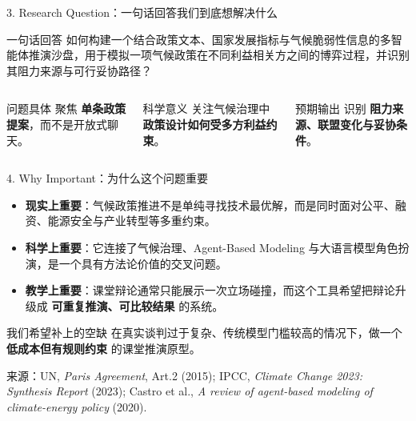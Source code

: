 \documentclass[aspectratio=169,10.5pt]{ctexbeamer}
\newcommand{\source}[1]{\vfill{\tiny\color{textgray}来源：#1}}
\begin{document}
\begin{frame}{3. Research Question：一句话回答我们到底想解决什么}
  \begin{alertblock}{一句话回答}
    如何构建一个结合政策文本、国家发展指标与气候脆弱性信息的多智能体推演沙盘，用于模拟一项气候政策在不同利益相关方之间的博弈过程，并识别其阻力来源与可行妥协路径？
  \end{alertblock}
  \begin{columns}[T]
    \begin{block}{问题具体}
      聚焦 \textbf{单条政策提案}，而不是开放式聊天。
    \end{block}
    \begin{block}{科学意义}
      关注气候治理中 \textbf{政策设计如何受多方利益约束}。
    \end{block}
    \begin{block}{预期输出}
      识别 \textbf{阻力来源、联盟变化与妥协条件}。
    \end{block}
  \end{columns}
\end{frame}

\begin{frame}{4. Why Important：为什么这个问题重要}
  \begin{itemize}
    \item \textbf{现实上重要}：气候政策推进不是单纯寻找技术最优解，而是同时面对公平、融资、能源安全与产业转型等多重约束。
    \item \textbf{科学上重要}：它连接了气候治理、Agent-Based Modeling 与大语言模型角色扮演，是一个具有方法论价值的交叉问题。
    \item \textbf{教学上重要}：课堂辩论通常只能展示一次立场碰撞，而这个工具希望把辩论升级成 \textbf{可重复推演、可比较结果} 的系统。
  \end{itemize}
  \begin{alertblock}{我们希望补上的空缺}
    在真实谈判过于复杂、传统模型门槛较高的情况下，做一个 \textbf{低成本但有规则约束} 的课堂推演原型。
  \end{alertblock}
  \source{UN, \emph{Paris Agreement}, Art.2 (2015); IPCC, \emph{Climate Change 2023: Synthesis Report} (2023); Castro et al., \emph{A review of agent-based modeling of climate-energy policy} (2020).}
\end{frame}
\end{document}

